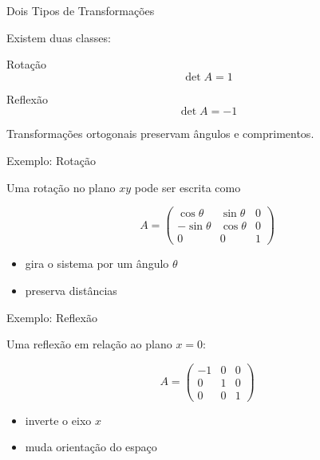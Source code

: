\documentclass[aspectratio=169]{beamer}
\begin{document}
\begin{frame}{Dois Tipos de Transformações}

Existem duas classes:

\begin{block}{Rotação}
\[
\det A = 1
\]
\end{block}

\begin{block}{Reflexão}
\[
\det A = -1
\]
\end{block}

\begin{tcolorbox}[colback=blue!5,colframe=blue]
Transformações ortogonais preservam ângulos e comprimentos.
\end{tcolorbox}

\end{frame}

\begin{frame}{Exemplo: Rotação}

Uma rotação no plano $xy$ pode ser escrita como

\[
A=
\begin{pmatrix}
\cos\theta & \sin\theta & 0\\
-\sin\theta & \cos\theta & 0\\
0 & 0 & 1
\end{pmatrix}
\]

\begin{itemize}
\item gira o sistema por um ângulo $\theta$
\item preserva distâncias
\end{itemize}

\end{frame}

\begin{frame}{Exemplo: Reflexão}

Uma reflexão em relação ao plano $x=0$:

\[
A=
\begin{pmatrix}
-1 & 0 & 0\\
0 & 1 & 0\\
0 & 0 & 1
\end{pmatrix}
\]

\begin{itemize}
\item inverte o eixo $x$
\item muda orientação do espaço
\end{itemize}

\end{frame}
\end{document}
